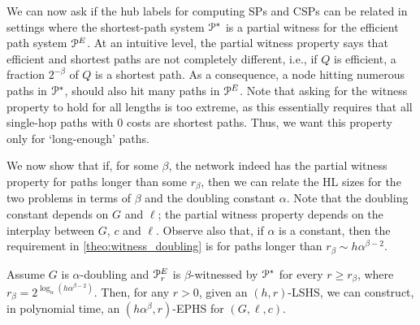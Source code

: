 We can now ask if the hub labels for computing SPs and CSPs can be related in settings where the shortest-path system $\mathcal{P}^*$ is a partial witness for the efficient path system $\mathcal{P}^E$.
At an intuitive level, the partial witness property says that efficient and shortest paths are not completely different, i.e., if $Q$ is efficient, a fraction $2^{-\beta}$ of $Q$ is a shortest path.
As a consequence, a node hitting numerous paths in $\mathcal{P}^*$, should also hit many paths in $\mathcal{P}^E$.
Note that asking for the witness property to hold for all lengths is too extreme, as this essentially requires that all single-hop paths with 0 costs are shortest paths.
Thus, we want this property only for `long-enough' paths. 

We now show that if, for some $\beta$, the network indeed has the partial witness property for paths longer than some $r_\beta$, then we can relate the HL sizes for the two problems in terms of $\beta$ and the doubling constant $\alpha$. 
Note that the doubling constant depends on $G$ and $\ell$; the partial witness property depends on the interplay between $G$, $c$ and $\ell$.
Observe also that, if $\alpha$ is a constant, then the requirement in \cref{theo:witness_doubling} is for paths longer than $r_\beta\sim h\alpha^{\beta-2}$.
\begin{theorem}\label{theo:witness_doubling}
Assume $G$ is $\alpha$-doubling and $\mathcal{P}^E_r$ is $\beta$-witnessed by $\mathcal{P}^*$ for every $r\geq r_\beta$, where $r_\beta=2^{\log_\alpha(h\alpha^{\beta-2})}$. 
Then, for any $r>0$, given an $(h,r)$-LSHS, we can construct, in polynomial time, an $(h\alpha^{\beta},r)$-EPHS for $(G,\ell,c)$.
\end{theorem}


